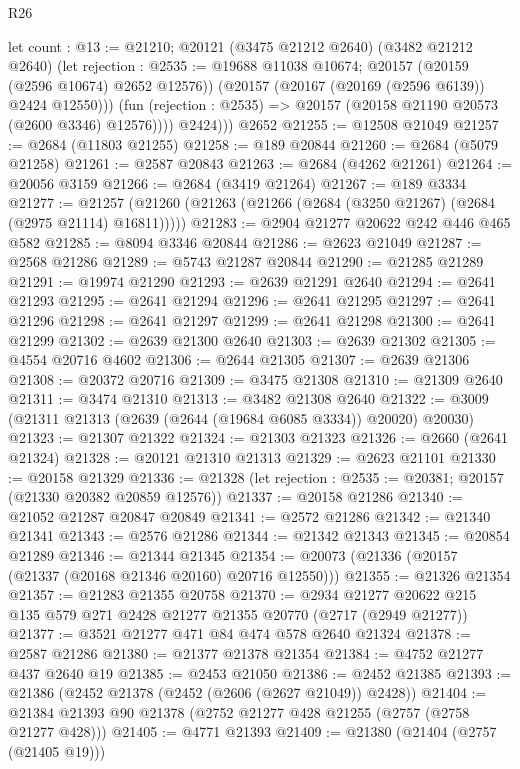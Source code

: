 \begin{lexlean}{R26}
\begin{coremodule}
            let count : @13 := @21210;
            @20121
              (@3475 @21212 @2640)
              (@3482 @21212 @2640)
              (let rejection : @2535 := @19688 @11038 @10674;
              @20157 (@20159 (@2596 @10674) @2652 @12576))
              (@20157 (@20167 (@20169 (@2596 @6139)) @2424 @12550)))
            (fun (rejection : @2535) => @20157 (@20158 @21190 @20573 (@2600 @3346) @12576))))
          @2424)))
    @2652
@21255 := @12508 @21049
@21257 := @2684 (@11803 @21255)
@21258 := @189 @20844
@21260 := @2684 (@5079 @21258)
@21261 := @2587 @20843
@21263 := @2684 (@4262 @21261)
@21264 := @20056 @3159
@21266 := @2684 (@3419 @21264)
@21267 := @189 @3334
@21277 := @21257 (@21260 (@21263 (@21266 (@2684 (@3250 @21267) (@2684 (@2975 @21114) @16811)))))
@21283 := @2904 @21277 @20622 @242 @446 @465 @582
@21285 := @8094 @3346 @20844
@21286 := @2623 @21049
@21287 := @2568 @21286
@21289 := @5743 @21287 @20844
@21290 := @21285 @21289
@21291 := @19974 @21290
@21293 := @2639 @21291 @2640
@21294 := @2641 @21293
@21295 := @2641 @21294
@21296 := @2641 @21295
@21297 := @2641 @21296
@21298 := @2641 @21297
@21299 := @2641 @21298
@21300 := @2641 @21299
@21302 := @2639 @21300 @2640
@21303 := @2639 @21302
@21305 := @4554 @20716 @4602
@21306 := @2644 @21305
@21307 := @2639 @21306
@21308 := @20372 @20716
@21309 := @3475 @21308
@21310 := @21309 @2640
@21311 := @3474 @21310
@21313 := @3482 @21308 @2640
@21322 := @3009 (@21311 @21313 (@2639 (@2644 (@19684 @6085 @3334)) @20020) @20030)
@21323 := @21307 @21322
@21324 := @21303 @21323
@21326 := @2660 (@2641 @21324)
@21328 := @20121 @21310 @21313
@21329 := @2623 @21101
@21330 := @20158 @21329
@21336 := @21328 (let rejection : @2535 := @20381; @20157 (@21330 @20382 @20859 @12576))
@21337 := @20158 @21286
@21340 := @21052 @21287 @20847 @20849
@21341 := @2572 @21286
@21342 := @21340 @21341
@21343 := @2576 @21286
@21344 := @21342 @21343
@21345 := @20854 @21289
@21346 := @21344 @21345
@21354 := @20073 (@21336 (@20157 (@21337 (@20168 @21346 @20160) @20716 @12550)))
@21355 := @21326 @21354
@21357 := @21283 @21355 @20758
@21370 := @2934 @21277 @20622 @215 @135 @579 @271 @2428 @21277 @21355 @20770 (@2717 (@2949 @21277))
@21377 := @3521 @21277 @471 @84 @474 @578 @2640 @21324
@21378 := @2587 @21286
@21380 := @21377 @21378 @21354
@21384 := @4752 @21277 @437 @2640 @19
@21385 := @2453 @21050
@21386 := @2452 @21385
@21393 := @21386 (@2452 @21378 (@2452 (@2606 (@2627 @21049)) @2428))
@21404 := @21384 @21393 @90 @21378 (@2752 @21277 @428 @21255 (@2757 (@2758 @21277 @428)))
@21405 := @4771 @21393
@21409 := @21380 (@21404 (@2757 (@21405 @19)))

\end{coremodule}
\end{lexlean}
